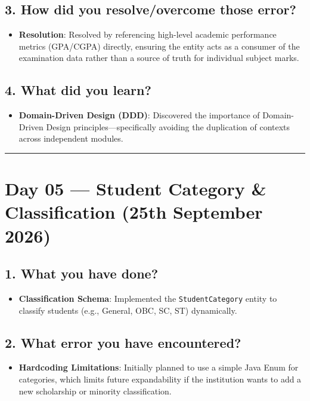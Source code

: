 \documentclass[12pt]{article}
\begin{document}
\subsection*{3. How did you resolve/overcome those error?}
\begin{itemize}
    \item \textbf{Resolution}: Resolved by referencing high-level academic performance metrics (GPA/CGPA) directly, ensuring the entity acts as a consumer of the examination data rather than a source of truth for individual subject marks.
\end{itemize}

\subsection*{4. What did you learn?}
\begin{itemize}
    \item \textbf{Domain-Driven Design (DDD)}: Discovered the importance of Domain-Driven Design principles—specifically avoiding the duplication of contexts across independent modules.
\end{itemize}

\vspace{0.5cm}
\hrule
\vspace{0.5cm}

\section*{Day 05 --- Student Category \& Classification (25th September 2026)}

\subsection*{1. What you have done?}
\begin{itemize}
    \item \textbf{Classification Schema}: Implemented the \texttt{StudentCategory} entity to classify students (e.g., General, OBC, SC, ST) dynamically.
\end{itemize}

\subsection*{2. What error you have encountered?}
\begin{itemize}
    \item \textbf{Hardcoding Limitations}: Initially planned to use a simple Java Enum for categories, which limits future expandability if the institution wants to add a new scholarship or minority classification.
\end{itemize}
\end{document}
